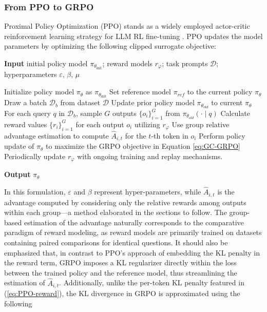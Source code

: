 \begin{itemize}[topsep=0pt]
\subsubsection{From PPO to GRPO} Proximal Policy Optimization (PPO) \citep{schulman2017proximal} stands as a widely employed actor-critic reinforcement learning strategy for LLM RL fine-tuning \citep{ouyang2022training}. PPO updates the model parameters by optimizing the following clipped surrogate objective:

\begin{algorithm}[t]
  \small
  \caption{Iterative Group Relative Policy Optimization}
  \textbf{Input} initial policy model $\pi_{\theta_{\text{init}}}$; reward models $r_\varphi$; task prompts $\mathcal{D}$; 
  hyperparameters $\varepsilon$, $\beta$, $\mu$
  \begin{algorithmic}[1]
    \State Initialize policy model $\pi_\theta$ as $\pi_{\theta_{\text{init}}}$
       \State Set reference model $\pi_{ref}$ to the current policy $\pi_{\theta}$
      \State Draw a batch $\mathcal{D}_b$ from dataset $\mathcal{D}$
      \State Update prior policy model $\pi_{\theta_{old}}$ to current $\pi_{\theta}$ 
      \State For each query $q$ in $\mathcal{D}_b$, sample $G$ outputs $\{o_i\}_{i=1}^G$ from $\pi_{\theta_{old}} (\cdot \mid q)$
      \State Calculate reward values $\{r_i\}_{i=1}^{G}$ for each output $o_i$ utilizing $r_\varphi$
      \State Use group relative advantage estimation to compute $\hat{A}_{i,t}$ for the $t$-th token in $o_i$
        \State Perform policy update of $\pi_{\theta}$ to maximize the GRPO objective in Equation \ref{eq:GC-GRPO}
      \EndFor
    \EndFor 
    \State Periodically update $r_\varphi$ with ongoing training and replay mechanisms.
    \EndFor 
  \end{algorithmic}
  \textbf{Output} $\pi_\theta$
  \label{alg:iter-grpo}
\end{algorithm}

In this formulation, $\varepsilon$ and $\beta$ represent hyper-parameters, while $\hat{A}_{i,t}$ is the advantage computed by considering only the relative rewards among outputs within each group—a method elaborated in the sections to follow. The group-based estimation of the advantage naturally corresponds to the comparative paradigm of reward modeling, as reward models are primarily trained on datasets containing paired comparisons for identical questions. It should also be emphasized that, in contrast to PPO’s approach of embedding the KL penalty in the reward term, GRPO imposes a KL regularizer directly within the loss between the trained policy and the reference model, thus streamlining the estimation of $\hat{A}_{i,t}$. Additionally, unlike the per-token KL penalty featured in (\ref{eq:PPO-reward}), the KL divergence in GRPO is approximated using the following


\end{itemize}
